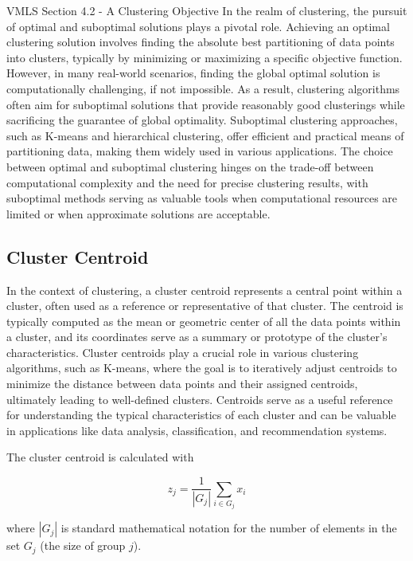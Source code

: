 \begin{notes}{VMLS Section 4.2 - A Clustering Objective}
    In the realm of clustering, the pursuit of optimal and suboptimal solutions plays a pivotal role. Achieving an optimal clustering solution involves finding the absolute best partitioning of data points 
    into clusters, typically by minimizing or maximizing a specific objective function. However, in many real-world scenarios, finding the global optimal solution is computationally challenging, if not 
    impossible. As a result, clustering algorithms often aim for suboptimal solutions that provide reasonably good clusterings while sacrificing the guarantee of global optimality. Suboptimal clustering 
    approaches, such as K-means and hierarchical clustering, offer efficient and practical means of partitioning data, making them widely used in various applications. The choice between optimal and suboptimal 
    clustering hinges on the trade-off between computational complexity and the need for precise clustering results, with suboptimal methods serving as valuable tools when computational resources are limited 
    or when approximate solutions are acceptable.

    \subsection*{Cluster Centroid}

    In the context of clustering, a cluster centroid represents a central point within a cluster, often used as a reference or representative of that cluster. The centroid is typically computed as the mean or 
    geometric center of all the data points within a cluster, and its coordinates serve as a summary or prototype of the cluster's characteristics. Cluster centroids play a crucial role in various clustering 
    algorithms, such as K-means, where the goal is to iteratively adjust centroids to minimize the distance between data points and their assigned centroids, ultimately leading to well-defined clusters. Centroids 
    serve as a useful reference for understanding the typical characteristics of each cluster and can be valuable in applications like data analysis, classification, and recommendation systems.

    \begin{highlight}
        The cluster centroid is calculated with 

        \begin{equation*}
            z_{j} = \frac{1}{|G_{j}|} \sum_{i \in G_{j}} x_{i}
        \end{equation*}

        where $|G_{j}|$ is standard mathematical notation for the number of elements in the set $G_{j}$ (the size of group $j$).
    \end{highlight}
\end{notes}

